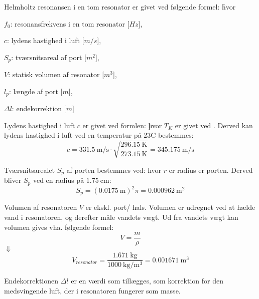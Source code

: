 Helmholtz resonansen i en tom resonator er givet ved følgende formel: \f
hvor 
\begin{description}[align=left, labelwidth=1in,labelindent=0.5cm]
\item $f_{0}$: resonansfrekvens i en tom resonator [$Hz$],\\
\item $c$: lydens hastighed i luft [$m/s$],\\
\item $S_{p}$: tværsnitsareal af port [$m^2$],\\
\item $V$: statisk volumen af resonator [$m^3$],\\
\item $l_{p}$: længde af port [$m$],\\
\item $\Delta l$: endekorrektion [$m$]\\
\end{description}
Lydens hastighed i luft $c$ er givet ved formlen: 
\c
hvor $T_{K}$ er givet ved \T. 
Derved kan lydens hastighed i luft ved en temperatur på 23\degree C bestemmes: 
\begin{equation}
		c = {\SI{331,5}{\meter / \second}} \cdot
		\sqrt{\frac{\SI{296,15}{\kelvin}}{\SI{273,15}{\kelvin}}} = {\SI{345,175}{\meter / \second}} 	\end{equation}
		
Tværsnitsarealet $S_{p}$ af porten bestemmes ved: 
\Sp 
hvor ${r}$ er radius er porten. 
Derved bliver $S_{p}$ ved en radius på ${\SI{1.75}{\centi \meter}}$:  
\begin{equation}
S_{p} = ({\SI{0,0175}{\meter}})^{2}\pi = {\SI{0,000962}{\meter^{2}}}	
\end{equation}  

Volumen af resonatoren $V$ er ekskl. port/ hals. Volumen er udregnet ved at hælde vand i resonatoren, og derefter måle vandets vægt. Ud fra vandets vægt kan volumen gives vha. følgende formel:  
\begin{equation}
  V=\frac{m}{\rho}
  \label{eq:vformel}
\end{equation}
$\Downarrow$
\begin{equation}
V_{resonator}=\frac{\SI{1,671}{\kilo\gram}}{\SI{1000}{\kilo \gram \per \meter^{3}}}={\SI{0,001671}{\meter^{3}}}
\end{equation}

Endekorrektionen $\Delta l$ er en værdi som tillægges, som korrektion for den medsvingende luft, der i resonatoren fungerer som masse. 

